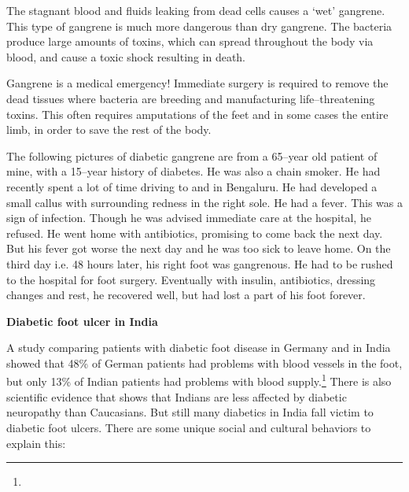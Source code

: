 The stagnant blood and fluids leaking from dead cells causes a ‘wet’ gangrene. This type of gangrene is much more dangerous than dry gangrene. The bacteria produce large amounts of toxins, which can spread throughout the body via blood, and cause a toxic shock resulting in death.

Gangrene is a medical emergency! Immediate surgery is required to remove the dead tissues where bacteria are breeding and manufacturing life–threatening toxins. This often requires amputations of the feet and in some cases the entire limb, in order to save the rest of the body.

The following pictures of diabetic gangrene are from a 65–year old patient of mine, with a 15–year history of diabetes. He was also a chain smoker. He had recently spent a lot of time driving to and in Bengaluru. He had developed a small callus with surrounding redness in the right sole. He had a fever. This was a sign of infection. Though he was advised immediate care at the hospital, he refused. He went home with antibiotics, promising to come back the next day. But his fever got worse the next day and he was too sick to leave home. On the third day i.e. 48 hours later, his right foot was gangrenous. He had to be rushed to the hospital for foot surgery. Eventually with insulin, antibiotics, dressing changes and rest, he recovered well, but had lost a part of his foot forever.

\textbf{Diabetic foot ulcer in India}

A study comparing patients with diabetic foot disease in Germany and in India showed that 48\% of German patients had problems with blood vessels in the foot, but only 13\% of Indian patients had problems with blood supply.\footnote{} There is also scientific evidence that shows that Indians are less affected by diabetic neuropathy than Caucasians. But still many diabetics in India fall victim to diabetic foot ulcers. There are some unique social and cultural behaviors to explain this:

